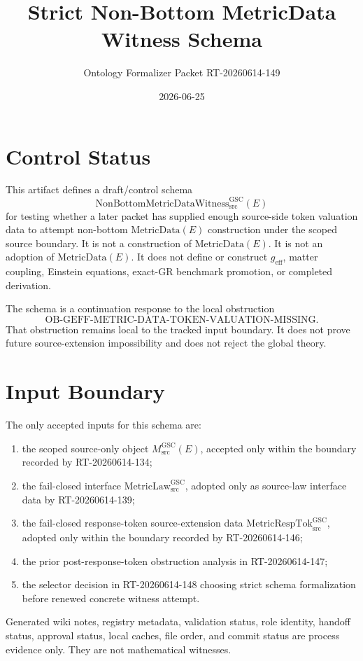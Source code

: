 \documentclass[11pt]{article}
\title{Strict Non-Bottom MetricData Witness Schema}
\author{Ontology Formalizer Packet RT-20260614-149}
\date{2026-06-25}
\newcommand{\MsrcGSC}{M_{\mathrm{src}}^{\mathrm{GSC}}}
\newcommand{\MetricLaw}{\mathrm{MetricLaw}_{\mathrm{src}}^{\mathrm{GSC}}}
\newcommand{\MetricRespTok}{\mathrm{MetricRespTok}_{\mathrm{src}}^{\mathrm{GSC}}}
\newcommand{\MetricData}{\mathrm{MetricData}}
\newcommand{\Witness}{\mathrm{NonBottomMetricDataWitness}_{\mathrm{src}}^{\mathrm{GSC}}}
\newcommand{\geff}{g_{\mathrm{eff}}}
\begin{document}
\maketitle

\section{Control Status}

This artifact defines a draft/control schema
\[
  \Witness(E)
\]
for testing whether a later packet has supplied enough source-side token
valuation data to attempt non-bottom \(\MetricData(E)\) construction under the
scoped source boundary. It is not a construction of \(\MetricData(E)\). It is
not an adoption of \(\MetricData(E)\). It does not define or construct
\(\geff\), matter coupling, Einstein equations, exact-GR benchmark promotion,
or completed derivation.

The schema is a continuation response to the local obstruction
\[
  \mathrm{OB\mbox{-}GEFF\mbox{-}METRIC\mbox{-}DATA\mbox{-}TOKEN\mbox{-}VALUATION\mbox{-}MISSING}.
\]
That obstruction remains local to the tracked input boundary. It does not prove
future source-extension impossibility and does not reject the global theory.

\section{Input Boundary}

The only accepted inputs for this schema are:
\begin{enumerate}[label=\textbf{I\arabic*.}]
  \item the scoped source-only object \(\MsrcGSC(E)\), accepted only within the
  boundary recorded by RT-20260614-134;
  \item the fail-closed interface \(\MetricLaw\), adopted only as source-law
  interface data by RT-20260614-139;
  \item the fail-closed response-token source-extension data
  \(\MetricRespTok\), adopted only within the boundary recorded by
  RT-20260614-146;
  \item the prior post-response-token obstruction analysis in RT-20260614-147;
  \item the selector decision in RT-20260614-148 choosing strict schema
  formalization before renewed concrete witness attempt.
\end{enumerate}

Generated wiki notes, registry metadata, validation status, role identity,
handoff status, approval status, local caches, file order, and commit status
are process evidence only. They are not mathematical witnesses.
\end{document}
